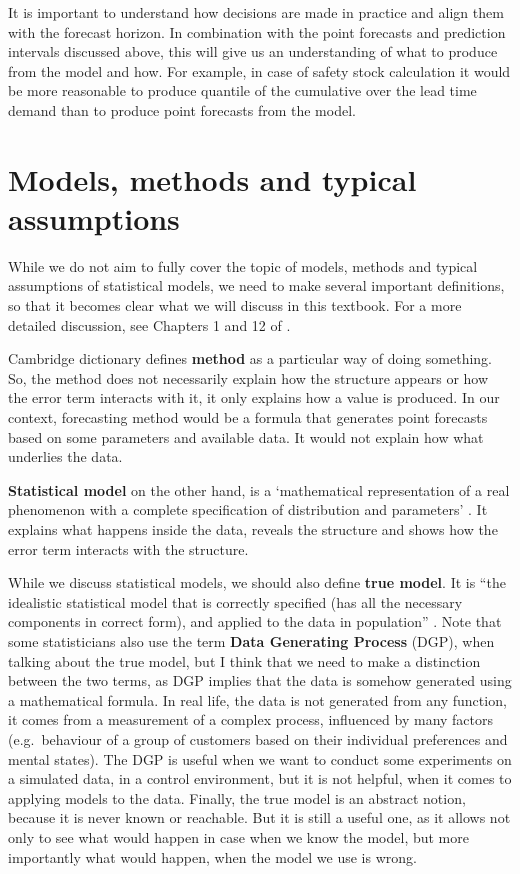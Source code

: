 \documentclass[
]{book}
\theoremstyle{definition}
\theoremstyle{definition}
\theoremstyle{definition}
\theoremstyle{definition}
\theoremstyle{remark}
\begin{document}
It is important to understand how decisions are made in practice and align them with the forecast horizon. In combination with the point forecasts and prediction intervals discussed above, this will give us an understanding of what to produce from the model and how. For example, in case of safety stock calculation it would be more reasonable to produce quantile of the cumulative over the lead time demand than to produce point forecasts from the model.

\hypertarget{modelsMethods}{%
\section{Models, methods and typical assumptions}\label{modelsMethods}}

While we do not aim to fully cover the topic of models, methods and typical assumptions of statistical models, we need to make several important definitions, so that it becomes clear what we will discuss in this textbook. For a more detailed discussion, see Chapters 1 and 12 of \citet{SvetunkovSBA}.

Cambridge dictionary \citep{CambridgeMethod} defines \textbf{method} as a particular way of doing something. So, the method does not necessarily explain how the structure appears or how the error term interacts with it, it only explains how a value is produced. In our context, forecasting method would be a formula that generates point forecasts based on some parameters and available data. It would not explain how what underlies the data.

\textbf{Statistical model} on the other hand, is a `mathematical representation of a real phenomenon with a complete specification of distribution and parameters' \citep{Svetunkov2019a}. It explains what happens inside the data, reveals the structure and shows how the error term interacts with the structure.

While we discuss statistical models, we should also define \textbf{true model}. It is ``the idealistic statistical model that is correctly specified (has all the necessary components in correct form), and applied to the data in population'' \citep{SvetunkovSBA}. Note that some statisticians also use the term \textbf{Data Generating Process} (DGP), when talking about the true model, but I think that we need to make a distinction between the two terms, as DGP implies that the data is somehow generated using a mathematical formula. In real life, the data is not generated from any function, it comes from a measurement of a complex process, influenced by many factors (e.g.~behaviour of a group of customers based on their individual preferences and mental states). The DGP is useful when we want to conduct some experiments on a simulated data, in a control environment, but it is not helpful, when it comes to applying models to the data. Finally, the true model is an abstract notion, because it is never known or reachable. But it is still a useful one, as it allows not only to see what would happen in case when we know the model, but more importantly what would happen, when the model we use is wrong.
\end{document}
